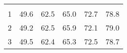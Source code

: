 \begin{tabular}{llllll}
  \multicolumn{1}{r}{} \\
\multicolumn{1}{l}{\hspace{3em}1} &
  \multicolumn{1}{|r}{49.6} &
  \multicolumn{1}{r}{62.5} &
  \multicolumn{1}{r}{65.0} &
  \multicolumn{1}{r}{72.7} &
  \multicolumn{1}{r}{78.8} \\
\multicolumn{1}{l}{\hspace{3em}2} &
  \multicolumn{1}{|r}{49.2} &
  \multicolumn{1}{r}{62.5} &
  \multicolumn{1}{r}{65.9} &
  \multicolumn{1}{r}{72.1} &
  \multicolumn{1}{r}{79.0} \\
\multicolumn{1}{l}{\hspace{3em}3} &
  \multicolumn{1}{|r}{49.5} &
  \multicolumn{1}{r}{62.4} &
  \multicolumn{1}{r}{65.3} &
  \multicolumn{1}{r}{72.5} &
  \multicolumn{1}{r}{78.7} \\
\cline{1-6}
\end{tabular}
